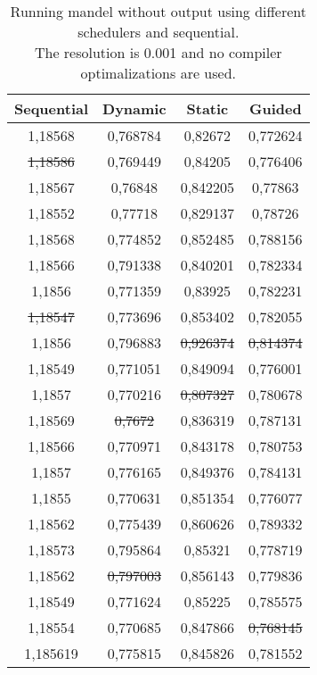 \documentclass[a4paper]{article}
\begin{document}
\begin{table}
	\caption{Running mandel without output using different schedulers and sequential.\\The resolution is 0.001 and no compiler optimalizations are used.}
	\label{table:mandel_nout_schedulers}
	\begin{center}
		\begin{tabular}{| c | c | c | c |}
			\hline
			Sequential & Dynamic & Static & Guided\\ 
			\hline
			1,18568 & 0,768784 & 0,82672 & 0,772624\\ 
			\st{1,18586} & 0,769449 & 0,84205 & 0,776406\\ 
			1,18567 & 0,76848 & 0,842205 & 0,77863\\ 
			1,18552 & 0,77718 & 0,829137 & 0,78726\\ 
			1,18568 & 0,774852 & 0,852485 & 0,788156\\ 
			1,18566 & 0,791338 & 0,840201 & 0,782334\\ 
			1,1856 & 0,771359 & 0,83925 & 0,782231\\ 
			\st{1,18547} & 0,773696 & 0,853402 & 0,782055\\ 
			1,1856 & 0,796883 & \st{0,926374} & \st{0,814374}\\ 
			1,18549 & 0,771051 & 0,849094 & 0,776001\\ 
			1,1857 & 0,770216 & \st{0,807327} & 0,780678\\ 
			1,18569 & \st{0,7672} & 0,836319 & 0,787131\\ 
			1,18566 & 0,770971 & 0,843178 & 0,780753\\ 
			1,1857 & 0,776165 & 0,849376 & 0,784131\\ 
			1,1855 & 0,770631 & 0,851354 & 0,776077\\ 
			1,18562 & 0,775439 & 0,860626 & 0,789332\\ 
			1,18573 & 0,795864 & 0,85321 & 0,778719\\ 
			1,18562 & \st{0,797003} & 0,856143 & 0,779836\\ 
			1,18549 & 0,771624 & 0,85225 & 0,785575\\ 
			1,18554 & 0,770685 & 0,847866 & \st{0,768145}\\ 
			\hline
			1,185619 & 0,775815 & 0,845826 & 0,781552\\ 
			\hline
		\end{tabular}
	\end{center}
\end{table}
\end{document}
